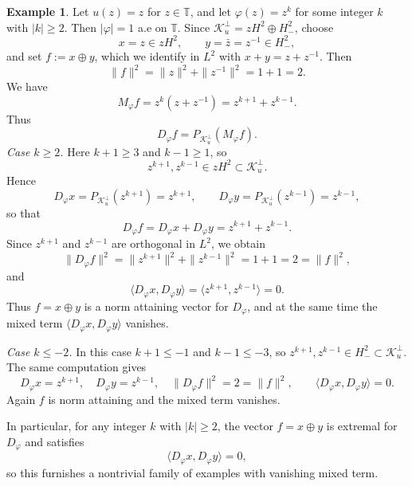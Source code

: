 \documentclass[12pt]{amsart}
\theoremstyle{definition}
\newtheorem{example}[theorem]{Example}
\theoremstyle{remark}
\def \T{\mathbb{T}}
\newcommand{\clk}{\mathcal{K}}
\newcommand{\vp}{\varphi}
\numberwithin{equation}{section}
\begin{document}
\begin{example}
Let $u(z)=z$ for $z\in\T$, and let $\vp(z)= z^{k}$ for some integer $k$ with $|k|\ge 2$. Then $|\vp|=1$ a.e on $\T$. Since $\clk_u^\perp = zH^2 \oplus H^2_{-}$, choose
\[
x=z \in zH^2, \qquad y=\bar{z}=z^{-1} \in H^2_{-},
\]
and set $f:=x\oplus y$, which we identify in $L^2$ with $x+y=z+z^{-1}$. Then
\[
\|f\|^2 = \|z\|^2 + \|z^{-1}\|^2 = 1+1 = 2.
\]
We have
\[
M_\vp f = z^k(z+z^{-1}) = z^{k+1} + z^{k-1}.
\]
Thus
\[
D_\vp f = P_{\clk_u^\perp}(M_\vp f).
\]
\textit{Case $k\ge 2$.}
Here $k+1\ge 3$ and $k-1\ge 1$, so
\[
z^{k+1}, z^{k-1} \in zH^2 \subset \clk_u^\perp.
\]
Hence
\[
D_\vp x = P_{\clk_u^\perp}(z^{k+1}) = z^{k+1}, \qquad
D_\vp y = P_{\clk_u^\perp}(z^{k-1}) = z^{k-1},
\]
so that
\[
D_\vp f = D_\vp x + D_\vp y = z^{k+1} + z^{k-1}.
\]
Since $z^{k+1}$ and $z^{k-1}$ are orthogonal in $L^2$, we obtain
\[
\|D_\vp f\|^2 = \|z^{k+1}\|^2 + \|z^{k-1}\|^2 = 1+1 = 2 = \|f\|^2,
\]
and
\[
\langle D_\vp x, D_\vp y\rangle = \langle z^{k+1}, z^{k-1}\rangle
= 0.
\]
Thus $f=x\oplus y$ is a norm attaining vector for $D_\vp$, and at the same time the mixed term $\langle D_\vp x, D_\vp y\rangle$ vanishes.
	
	
\textit{Case $k\le -2$.}
In this case $k+1\le -1$ and $k-1\le -3$, so $z^{k+1},z^{k-1}\in H^2_{-}\subset\clk_u^\perp$.
The same computation gives
\[D_\vp x = z^{k+1},\quad D_\vp y = z^{k-1},\quad
\|D_\vp f\|^2 = 2 = \|f\|^2,\qquad
\langle D_\vp x, D_\vp y\rangle = 0.\]
Again $f$ is norm attaining and the mixed term vanishes.
	
	\smallskip
In particular, for any integer $k$ with $|k|\ge 2$, the vector $f=x\oplus y$ is extremal for $D_\vp$ and satisfies
\[\langle D_\vp x, D_\vp y\rangle = 0,\]
so this furnishes a nontrivial family of examples with vanishing mixed term.
\end{example}
\end{document}
